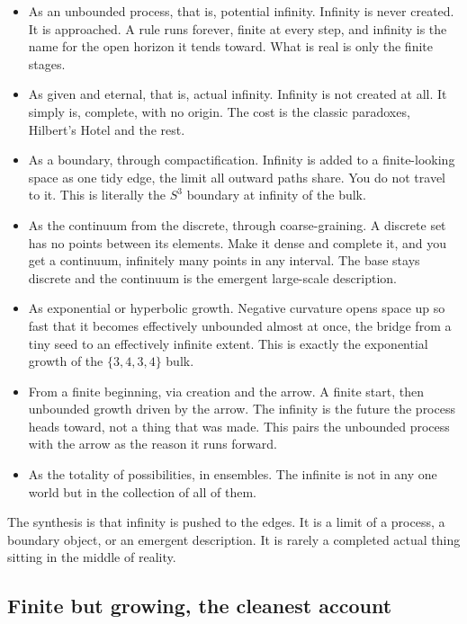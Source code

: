 \begin{itemize}
  \item As an unbounded process, that is, potential infinity. Infinity is never created. It is approached. A rule
  runs forever, finite at every step, and infinity is the name for the open horizon it tends toward. What is real
  is only the finite stages.
  \item As given and eternal, that is, actual infinity. Infinity is not created at all. It simply is, complete,
  with no origin. The cost is the classic paradoxes, Hilbert's Hotel and the rest.
  \item As a boundary, through compactification. Infinity is added to a finite-looking space as one tidy edge, the
  limit all outward paths share. You do not travel to it. This is literally the $S^3$ boundary at infinity of the
  bulk.
  \item As the continuum from the discrete, through coarse-graining. A discrete set has no points between its
  elements. Make it dense and complete it, and you get a continuum, infinitely many points in any interval. The
  base stays discrete and the continuum is the emergent large-scale description.
  \item As exponential or hyperbolic growth. Negative curvature opens space up so fast that it becomes effectively
  unbounded almost at once, the bridge from a tiny seed to an effectively infinite extent. This is exactly the
  exponential growth of the $\{3,4,3,4\}$ bulk.
  \item From a finite beginning, via creation and the arrow. A finite start, then unbounded growth driven by the
  arrow. The infinity is the future the process heads toward, not a thing that was made. This pairs the unbounded
  process with the arrow as the reason it runs forward.
  \item As the totality of possibilities, in ensembles. The infinite is not in any one world but in the collection
  of all of them.
\end{itemize}

The synthesis is that infinity is pushed to the edges. It is a limit of a process, a boundary object, or an
emergent description. It is rarely a completed actual thing sitting in the middle of reality.

\subsection{Finite but growing, the cleanest account}

